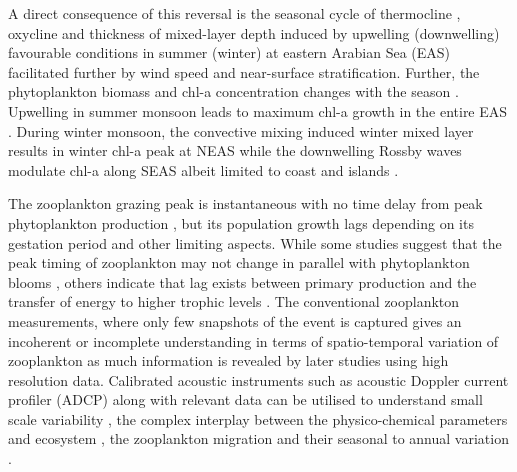 \documentclass[authoryear,review,12pt]{elsarticle}
\begin{document}
	A direct consequence of this reversal is the seasonal cycle of thermocline \citep{prasad1996mixed,prasannakumara20051848}, oxycline \citep{desousa1996seasonal,schmidt2020seasonal} and thickness of mixed-layer depth \citep[MLD;][]{shetye19911517,prasad1996mixed,prasannakumara20051848} induced by upwelling (downwelling) favourable conditions in summer (winter) at eastern Arabian Sea (EAS) facilitated further by wind speed and near-surface stratification. Further, the phytoplankton biomass and chl-a concentration changes with the season \citep{subrahmanyan1960studies, banse1968hydrography,prasannakumara20051848,levy2007basin, vijith2016consequences}. Upwelling in summer monsoon leads to maximum chl-a growth in the entire EAS \citep{banse1968hydrography, banse2000geographical, mccreary2009biophysical, hood2017biogeochemical,bemal2018picophytoplankton,shi2022phytoplankton}. During winter monsoon, the convective mixing induced winter mixed layer \citep{shetye1992does, madhupratap1996mechanism,mccreary1996four, levy2007basin,  shankar2016inhibition, vijith2016consequences, keerthi2017physical,shi2022phytoplankton} results in winter chl-a peak at NEAS while the downwelling Rossby waves modulate chl-a along SEAS albeit limited to coast and islands \citep{amol2020modulation}. 
	
	The zooplankton grazing peak is instantaneous with no time delay from peak phytoplankton production \citep{li2000determines,barber2001qn}, but its population growth lags \citep{rehim2012dynamical, almen2020temperature} depending on its gestation period and other limiting aspects. While some studies suggest that the peak timing of zooplankton may not change in parallel with phytoplankton blooms \citep{winder2004climatic}, others indicate that lag exists between primary production and the transfer of energy to higher trophic levels \citep{brock1992interannual, brock1991phytoplankton}. The conventional zooplankton measurements, where only few snapshots of the event is captured gives an incoherent or incomplete understanding in terms of spatio-temporal variation of zooplankton \citep{ramamurthy1965studies, madhupratap1992zooplankton,piontkovski1995spatial, madhupratap1996lack,wishner1998mesozooplankton,kidwai2000dd,barber2001qn,khandagale2022seasonal} as much information is revealed by later studies \citep{jyothibabu2010re, shankar2019role, aparna2022seasonal} using high resolution data. Calibrated acoustic instruments such as acoustic Doppler current profiler (ADCP) along with relevant data can be utilised to understand small scale variability \citep{nair1999arabian, edvardsen2003assessing, smith2005mesozooplankton, smeti2015spatial, kang2024acoustic}, the complex interplay between the physico-chemical parameters and ecosystem \citep{jiang2007temporal, potiris2018acoustic, shankar2019role, aparna2022seasonal, nie2023influence}, the zooplankton migration \citep{inoue2016diel,ursella2018evidence, ursella2021diel} and their seasonal to annual variation \citep{jiang2007temporal, hobbs2021marine,liu2022seasonal, aparna2022seasonal}.
	
\end{document}
